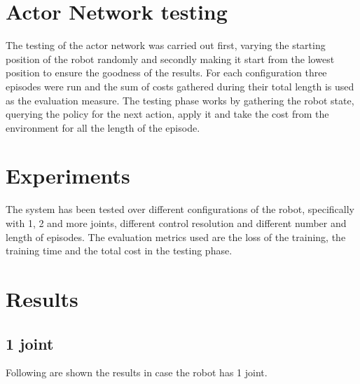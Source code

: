 \documentclass[twocolumn, a4paper]{article}
\begin{document}
\section{Actor Network testing}
The testing of the actor network was carried out first, varying the starting
position of the robot randomly and secondly making it start from the lowest
position to ensure the goodness of the results.
For each configuration three episodes were run and the sum of costs gathered
during their total length is used as the evaluation measure.
The testing phase works by gathering the robot state, querying the policy
for the next action, apply it and take the cost from the environment for all
the length of the episode.

\section{Experiments}
The system has been tested over different configurations of the robot,
specifically with 1, 2 and more joints, different control resolution and
different number and length of episodes.
The evaluation metrics used are the loss of the training, the training time
and the total cost in the testing phase.

\section{Results}
\subsection{1 joint}
Following are shown the results in case the robot has 1 joint.
\end{document}
